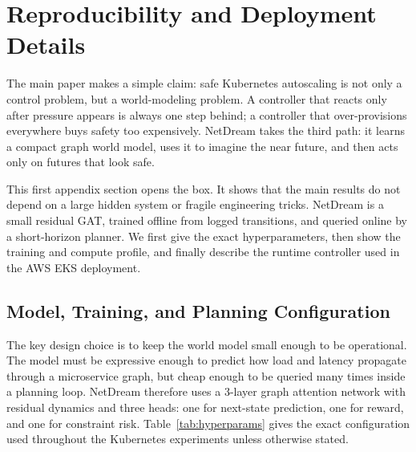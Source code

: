 
\section{Reproducibility and Deployment Details}
\label{app:reproducibility}

The main paper makes a simple claim: safe Kubernetes autoscaling is not
only a control problem, but a world-modeling problem.  A controller that
reacts only after pressure appears is always one step behind; a
controller that over-provisions everywhere buys safety too expensively.
NetDream takes the third path: it learns a compact graph world model,
uses it to imagine the near future, and then acts only on futures that
look safe.

This first appendix section opens the box.  It shows that the main
results do not depend on a large hidden system or fragile engineering
tricks.  NetDream is a small residual GAT, trained offline from logged
transitions, and queried online by a short-horizon planner.  We first
give the exact hyperparameters, then show the training and compute
profile, and finally describe the runtime controller used in the AWS EKS
deployment.

\subsection{Model, Training, and Planning Configuration}
\label{app:hyperparams}

The key design choice is to keep the world model small enough to be
operational.  The model must be expressive enough to predict how load and
latency propagate through a microservice graph, but cheap enough to be
queried many times inside a planning loop.  NetDream therefore uses a
3-layer graph attention network with residual dynamics and three heads:
one for next-state prediction, one for reward, and one for constraint
risk.  Table~\ref{tab:hyperparams} gives the exact configuration used
throughout the Kubernetes experiments unless otherwise stated.

